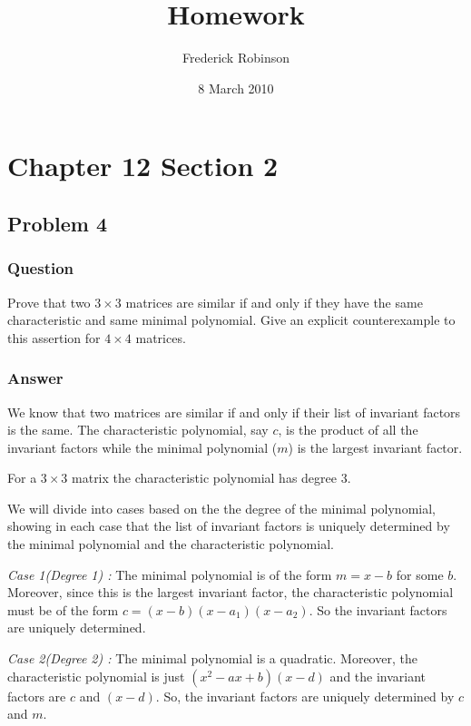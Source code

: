 \documentclass[12pt]{article}
\title{Homework}
\author{Frederick Robinson}
\date{8 March 2010}
\begin{document}

   \maketitle

\setcounter{tocdepth}{2} 

\tableofcontents

\section{Chapter 12 Section 2}
\subsection{Problem 4}

\subsubsection{Question}
Prove that two $3 \times 3$ matrices are similar if and only if they have the same characteristic and same minimal polynomial. Give an explicit counterexample to this assertion for $4 \times 4$ matrices.
\subsubsection{Answer}
We know that two matrices are similar if and only if their list of invariant factors is the same. The characteristic polynomial, say $c$, is the product of all the invariant factors while the minimal polynomial ($m$) is the largest invariant factor. 

For a $3 \times 3$ matrix the characteristic polynomial has degree 3. 

We will divide into cases based on the the degree of the minimal polynomial, showing in each case that the list of invariant factors is uniquely determined by the minimal polynomial and the characteristic polynomial.

\emph{Case 1(Degree 1) : } The minimal polynomial is of the form $m = x - b$ for some $b$. Moreover, since this is the largest invariant factor, the characteristic polynomial must be of the form $c = (x-b)(x-a_1)(x-a_2)$. So the invariant factors are uniquely determined.

\emph{Case 2(Degree 2) : } The minimal polynomial is a quadratic. Moreover, the characteristic polynomial is just $(x^2-ax+b)(x-d)$ and the invariant factors are $c$ and $(x-d)$. So, the invariant factors are uniquely determined by $c$ and $m$.
\end{document}
